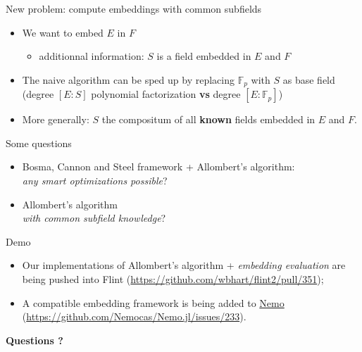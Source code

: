 \documentclass[francais]{beamer}
\def\F {\ensuremath{\mathbb{F}}}
\begin{document}
\begin{frame}{New problem: compute embeddings with common subfields}
  \begin{itemize}
    \item We want to embed $E$ in $F$
      \begin{itemize}
        \item additionnal information: $S$ is a field embedded in $E$ and $F$
      \end{itemize}
    \item The naive algorithm can be sped up by replacing $\F_p$ with
      $S$ as base field\\
      (degree $[E:S]$ polynomial factorization \textbf{vs} degree
      $[E:\mathbb{F}_p]$)
    \item More generally: $S$ the compositum of all \textbf{known}
      fields embedded in $E$ and $F$.
  \end{itemize}
\end{frame}

\begin{frame}{Some questions}
  \begin{itemize}
  \item Bosma, Cannon and Steel framework + Allombert's algorithm:\\
    \emph{any smart optimizations possible}?
  \item Allombert's algorithm\\ \emph{with common subfield knowledge}?
  \end{itemize}
\end{frame}

\begin{frame}{Demo}
  \begin{itemize}
  \item Our implementations of Allombert's algorithm + \emph{embedding
      evaluation} are being pushed into Flint
    (\url{https://github.com/wbhart/flint2/pull/351});
  \item A compatible embedding framework is being added to
    \href{http://nemocas.org/}{Nemo}
    (\url{https://github.com/Nemocas/Nemo.jl/issues/233}).
  \end{itemize}
\end{frame}

\begin{frame}
\Huge \textbf{Questions ?}
\end{frame}

\begin{frame}[allowframebreaks]\frametitle{\refname}
  \scriptsize
    
    
\end{frame}
\end{document}
